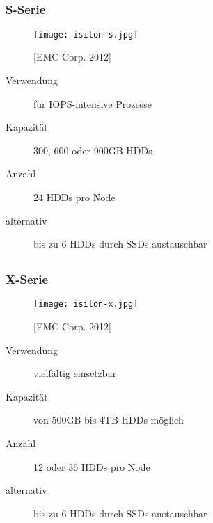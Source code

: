 \documentclass{beamer}
\begin{document}
\subsection{}


\begin{frame}[fragile]
  \frametitle{S-Serie}
  
  \begin{figure}[htp]
    \centering
    \texttt{[image: isilon-s.jpg]}
    \caption{[EMC Corp. 2012]}
  \end{figure}
  
    \begin{description} 
    \item[Verwendung] für IOPS-intensive Prozesse 
    \vspace{5mm}
    \item[Kapazität]300, 600 oder 900GB HDDs
    \item[Anzahl] 24 HDDs pro Node 
    \item[alternativ] bis zu 6 HDDs durch SSDs austauschbar
        
  \end{description}

\end{frame}

\subsection{}
\begin{frame}[fragile]
  \frametitle{X-Serie}
  
  \begin{figure}[htp]
    \centering
    \texttt{[image: isilon-x.jpg]}
    \caption{[EMC Corp. 2012]}
  \end{figure}
  
  \begin{description} 
    \item[Verwendung] vielfältig einsetzbar 
    \vspace{5mm}
    \item[Kapazität] von 500GB bis 4TB HDDs möglich
    \item[Anzahl]  12 oder 36 HDDs pro Node 
    \item[alternativ] bis zu 6 HDDs durch SSDs austauschbar
        
  \end{description}

\end{frame}
\end{document}
